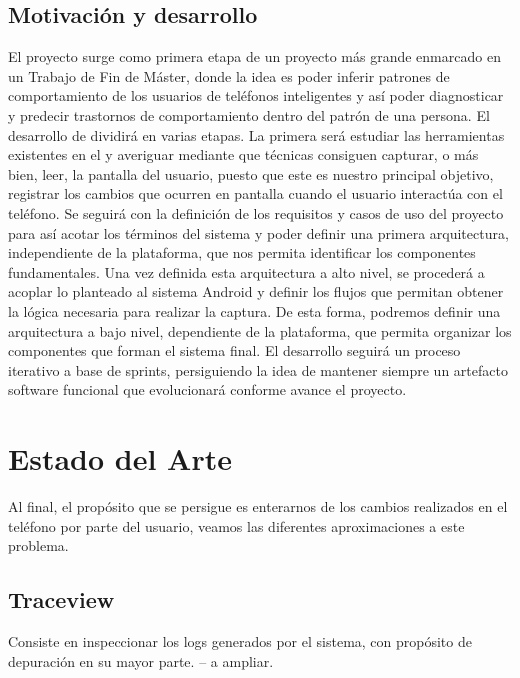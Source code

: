 \documentclass[12pt,a4paper,oneside]{book} %
\begin{document}
\section{Motivación y desarrollo}
El proyecto surge como primera etapa de un proyecto más grande enmarcado en un Trabajo de Fin de Máster, donde la idea es poder inferir patrones de comportamiento de los usuarios de teléfonos inteligentes y así poder diagnosticar y predecir trastornos de comportamiento dentro del patrón de una persona. 
\newline
\newline
El desarrollo de dividirá en varias etapas. La primera será estudiar las herramientas existentes en el y averiguar mediante que técnicas consiguen capturar, o más bien, leer, la pantalla del usuario, puesto que este es nuestro principal objetivo, registrar los cambios que ocurren en pantalla cuando el usuario interactúa con el teléfono. 
\newline
\newline
Se seguirá con la definición de los requisitos y casos de uso del proyecto para así acotar los términos del sistema y poder definir una primera arquitectura, independiente de la plataforma, que nos permita identificar los componentes fundamentales. 
\newline
\newline
Una vez definida esta arquitectura a alto nivel, se procederá a acoplar lo planteado al sistema Android y definir los flujos que permitan obtener la lógica necesaria para realizar la captura. De esta forma, podremos definir una arquitectura a bajo nivel, dependiente de la plataforma, que permita organizar los componentes que forman el sistema final. 
\newline
\newline
El desarrollo seguirá un proceso iterativo a base de sprints, persiguiendo la idea de mantener siempre un artefacto software funcional que evolucionará conforme avance el proyecto. 
\chapter{Estado del Arte}
Al final, el propósito que se persigue es enterarnos de los cambios realizados en el teléfono por parte del usuario, veamos las diferentes aproximaciones a este problema. 
\section{Traceview}
Consiste en inspeccionar los logs generados por el sistema, con propósito de depuración en su mayor parte. -- a ampliar. 
\end{document}
